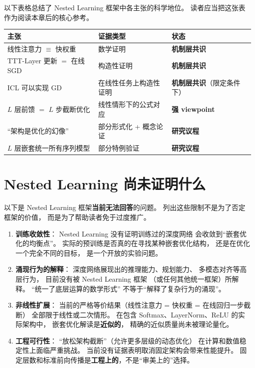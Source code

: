 以下表格总结了 Nested Learning 框架中各主张的科学地位。
读者应当把这张表作为阅读本章后的核心参考。

\begin{center}
\begin{tabular}{p{5cm} p{3.5cm} p{4cm}}
\toprule
\textbf{主张} & \textbf{证据类型} & \textbf{状态} \\
\midrule
线性注意力 $\equiv$ 快权重
& 数学证明
& \textbf{机制层共识} \\
TTT-Layer 更新 $=$ 在线 SGD
& 构造性证明
& \textbf{机制层共识} \\
ICL 可以实现 GD
& 在线性任务上构造性证明
& \textbf{机制层共识}（限定条件下） \\
$L$ 层前馈 $=$ $L$ 步截断优化
& 线性情形下的公式对应
& \textbf{强 viewpoint} \\
``架构是优化的幻像''
& 部分形式化 + 概念论证
& \textbf{研究议程} \\
$L$ 层嵌套统一所有序列模型
& 部分特例验证
& \textbf{研究议程} \\
\bottomrule
\end{tabular}
\end{center}

\section{Nested Learning 尚未证明什么}
\label{sec:nested_not_proven}

以下是 Nested Learning 框架\textbf{当前无法回答}的问题。
列出这些限制不是为了否定框架的价值，
而是为了帮助读者免于过度推广。

\begin{enumerate}
  \item \textbf{训练收敛性}：
    Nested Learning 没有证明训练过的深度网络
    会收敛到``嵌套优化的均衡点''。
    实际的预训练是否真的在寻找某种嵌套优化结构，
    还是在优化一个完全不同的目标，
    是一个开放的实验问题。

  \item \textbf{涌现行为的解释}：
    深度网络展现出的推理能力、规划能力、
    多模态对齐等高层行为，
    目前没有被 Nested Learning 框架
    （或任何其他统一框架）所解释。
    ``统一了底层运算的数学形式''
    不等于``解释了复杂行为的涌现''。

  \item \textbf{非线性扩展}：
    当前的严格等价结果（线性注意力 = 快权重 = 在线回归一步截断）
    全部限于线性或二次情形。
    在包含 Softmax、LayerNorm、ReLU 的实际架构中，
    嵌套优化解读是\textbf{近似的}，
    精确的近似质量尚未被理论量化。

  \item \textbf{工程可行性}：
    ``放松架构截断''（允许更多层级的动态优化）
    在计算和数值稳定性上面临严重挑战。
    当前没有证据表明取消固定架构会带来性能提升。
    固定层数和标准前向传播是\textbf{工程上的}，不是``审美上的''选择。
\end{enumerate}

